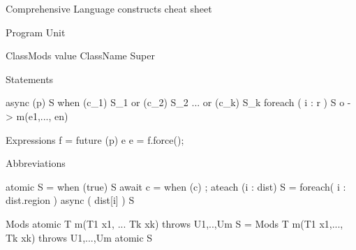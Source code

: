 Comprehensive Language constructs cheat sheet


Program Unit

  ClassMods value ClassName Super

Statements

  async (p) S
  when (c_1) S_1 or (c_2) S_2 ... or (c_k) S_k
  foreach ( i : r ) S 
  o -> m(e1,..., en)

Expressions
  f = future (p) {e}
  e = f.force();

Abbreviations

  atomic S = when (true) S
  await c = when (c) {;}
  ateach (i : dist) S = 
    foreach( i : dist.region )
      async ( dist[i] ) S

  Mods atomic T m(T1 x1, ... Tk xk) throws U1,..,Um { S } =
      Mods T m(T1 x1,..., Tk xk) throws  U1,...,Um { atomic { S }}
        
